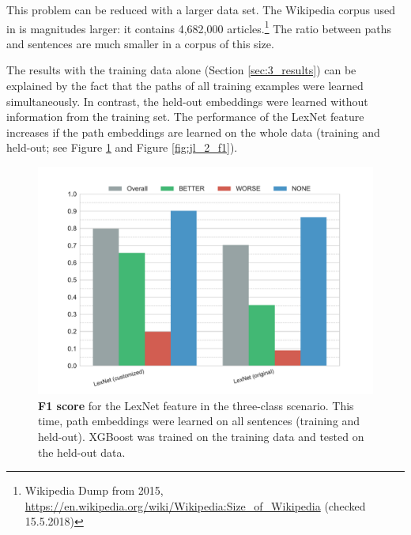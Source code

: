 This problem can be reduced with a larger data set. The Wikipedia corpus used in \cite{DBLP:conf/acl/ShwartzGD16} is magnitudes larger: it contains 4,682,000 articles.\footnote{Wikipedia Dump from 2015, \url{https://en.wikipedia.org/wiki/Wikipedia:Size_of_Wikipedia} (checked 15.5.2018)} The ratio between paths and sentences are much smaller in a corpus of this size.

The results with the training data alone (Section \ref{sec:3_results}) can be explained by the fact that the paths of all training examples were learned simultaneously. In contrast, the held-out embeddings were learned without information from the training set. The performance of the LexNet feature increases if the path embeddings are learned on the whole data (training and held-out; see Figure \ref{fig:jl_3_f1} and Figure \ref{fig:jl_2_f1}).


\begin{figure}[htbp]
         \caption{\textbf{F1 score} for the LexNet feature in the three-class scenario. This time, path embeddings were learned on all sentences (training and held-out). XGBoost was trained on the training data and tested on the held-out data.} 
    \label{fig:jl_3_f1}
    \centering
	\includegraphics[width=1\linewidth]{images/extra/jl-f1-False}
    \end{figure}
    
